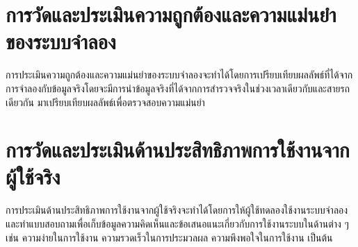 \section{การวัดและประเมินความถูกต้องและความแม่นยำของระบบจำลอง}
\begin{mypara}
    \indent การประเมินความถูกต้องและความแม่นยำของระบบจำลองจะทำได้โดยการเปรียบเทียบผลลัพธ์ที่ได้จาก
    การจำลองกับข้อมูลจริงโดยจะมีการนำข้อมูลจริงที่ได้จากการสำรวจจริงในช่วงเวลาเดียวกับและสายรถเดียวกัน มาเปรียบเทียบผลลัพธ์เพื่อตรวจสอบความแม่นยำ
\end{mypara}
\section{การวัดและประเมินด้านประสิทธิภาพการใช้งานจากผู้ใช้จริง}
\begin{mypara}
    \indent การประเมินด้านประสิทธิภาพการใช้งานจากผู้ใช้จริงจะทำได้โดยการให้ผู้ใช้ทดลองใช้งานระบบจำลอง
    และทำแบบสอบถามเพื่อเก็บข้อมูลความคิดเห็นและข้อเสนอแนะเกี่ยวกับการใช้งานระบบในด้านต่าง ๆ เช่น
    ความง่ายในการใช้งาน ความรวดเร็วในการประมวลผล ความพึงพอใจในการใช้งาน เป็นต้น
\end{mypara}